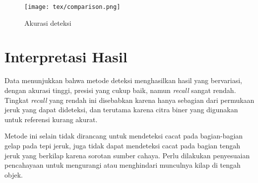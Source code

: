 \documentclass[laporan.tex]{subfiles}
\begin{document}
\begin{figure}[h]
\centering
\texttt{[image: tex/comparison.png]}
\caption{Akurasi deteksi}
\end{figure}

\section{Interpretasi Hasil}

Data menunjukkan bahwa metode deteksi menghasilkan hasil yang bervariasi, dengan akurasi tinggi, presisi yang cukup baik, namun \emph{recall} sangat rendah. Tingkat \emph{recall} yang rendah ini disebabkan karena hanya sebagian dari permukaan jeruk yang dapat dideteksi, dan terutama karena citra biner yang digunakan untuk referensi kurang akurat.

Metode ini selain tidak dirancang untuk mendeteksi cacat pada bagian-bagian gelap pada tepi jeruk, juga tidak dapat mendeteksi cacat pada bagian tengah jeruk yang berkilap karena sorotan sumber cahaya. Perlu dilakukan penyesuaian pencahayaan untuk mengurangi atau menghindari munculnya kilap di tengah objek.


\end{document}
